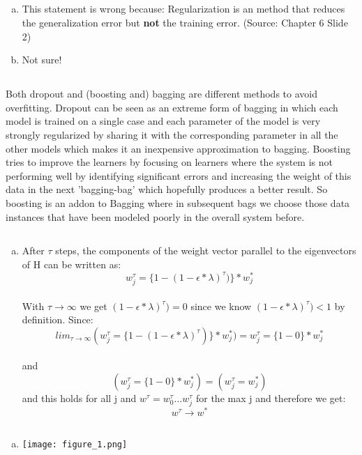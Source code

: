 \documentclass[12pt]{article}
\begin{document}

\setcounter{section}{6}
\setcounter{subsection}{1}

\subsection{ }

\begin{enumerate}[a)]
    \item   
        This statement is wrong because: Regularization is an method that reduces the generalization error but \textbf{not} the training error. (Source: Chapter 6 Slide 2)
    \item
        Not sure!
\end{enumerate}

\subsection{}
Both dropout and (boosting and) bagging are different methods to avoid overfitting.
Dropout can be seen as an extreme form of bagging in which each model is trained on a single case and each parameter of the model is very strongly regularized by sharing it with the corresponding parameter in all the other models which makes it an inexpensive approximation to bagging.
Boosting tries to improve the learners by focusing on learners where the system is not performing well by identifying significant errors and increasing the weight of this data in the next 'bagging-bag' which hopefully produces a better result. So boosting is an addon to Bagging where in subsequent bags we choose those data instances that have been modeled poorly in the overall system before.

\subsection{}
\begin{enumerate}[a)]
	\item 
		After $\tau$ steps, the components of the weight vector parallel to the eigenvectors of H can be written as:\\
			$$w^\tau_j= \{1-(1- \epsilon*\lambda)^\tau)\}*w^*_j $$ \\
		With $\tau \rightarrow \infty $ we get $(1- \epsilon*\lambda)^\tau)=0$ since we know $(1- \epsilon*\lambda)^\tau)<1$ by definition. Since:
		   $$lim_{\tau \rightarrow \infty} (w^\tau_j= \{1-(1- \epsilon*\lambda)^\tau)\}*w^*_j) = w^\tau_j= \{1-0\}*w^*_j$$\\
		   and \\
		   $$(w^\tau_j= \{1-0\}*w^*_j)= (w^\tau_j= w^*_j)$$
		   and this holds for all j and $w^\tau= w^\tau_0 \dots w^\tau_j$ for the max j and therefore we get:\\
		   $$ w^\tau \rightarrow w^* $$
		    
		
\end{enumerate}

\subsection{}
\begin{enumerate}[a)]
	\item 
		\texttt{[image: figure\_1.png]}
		    
		
\end{enumerate}
\end{document}
